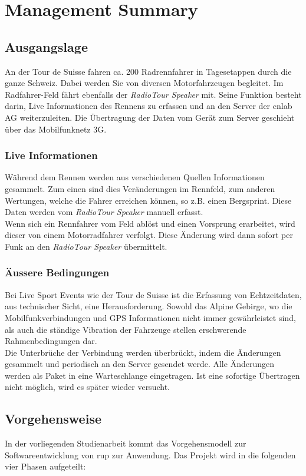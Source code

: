 \chapter*{Management Summary}

\section*{Ausgangslage}
An der Tour de Suisse fahren ca. 200 Radrennfahrer in Tagesetappen durch die ganze Schweiz. Dabei werden Sie von diversen Motorfahrzeugen begleitet. Im Radfahrer-Feld fährt ebenfalls der \textit{RadioTour Speaker} mit. Seine Funktion besteht darin, Live Informationen des Rennens zu erfassen und an den Server der cnlab AG weiterzuleiten.  Die Übertragung der Daten vom Gerät zum Server geschieht über das Mobilfunknetz 3G.

\subsection*{Live Informationen}
Während dem Rennen werden aus verschiedenen Quellen Informationen gesammelt. Zum einen sind dies Veränderungen im Rennfeld, zum anderen Wertungen, welche die Fahrer erreichen können, so z.B. einen Bergsprint. Diese Daten werden vom \textit{RadioTour Speaker} manuell erfasst.
\\
Wenn sich ein Rennfahrer vom Feld ablöst und einen Vorsprung erarbeitet, wird dieser von einem Motorradfahrer verfolgt. Diese Änderung wird dann sofort per Funk an den \textit{RadioTour Speaker} übermittelt.

\subsection*{Äussere Bedingungen}
Bei Live Sport Events wie der Tour de Suisse ist die Erfassung von Echtzeitdaten, aus technischer Sicht, eine Herausforderung. Sowohl das Alpine Gebirge, wo die Mobilfunkverbindungen und GPS Informationen nicht immer gewährleistet sind, als auch die ständige Vibration der Fahrzeuge stellen erschwerende Rahmenbedingungen dar.
\\
Die Unterbrüche der Verbindung werden überbrückt, indem die Änderungen gesammelt und periodisch an den Server gesendet werde. Alle Änderungen werden als Paket in eine Warteschlange eingetragen. Ist eine sofortige Übertragen nicht möglich, wird es später wieder versucht.

\newpage

\section*{Vorgehensweise}
In der vorliegenden Studienarbeit kommt das Vorgehensmodell zur Softwareentwicklung von \gls{rup} zur Anwendung. Das Projekt wird in die folgenden vier Phasen aufgeteilt:


